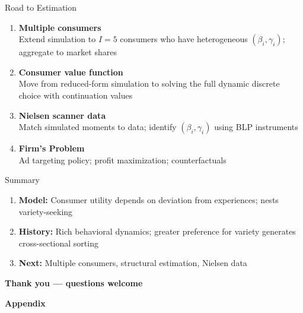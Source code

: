 \documentclass[aspectratio=169,professionalfonts]{beamer}
\newcommand{\hl}[1]{\textbf{\textcolor{UGARed}{#1}}}
\begin{document}
\begin{frame}{Road to Estimation}
  \begin{enumerate}
    \item \hl{Multiple consumers} \\
          Extend simulation to $I = 5$ consumers who have heterogeneous $(\beta_i, \gamma_i)$;
          aggregate to market shares

    \vspace{4pt}
    \item \hl{Consumer value function} \\
          Move from reduced-form simulation to solving the full
          dynamic discrete choice with continuation values

    \vspace{4pt}
    \item \hl{Nielsen scanner data} \\
          Match simulated moments to data;
          identify $(\beta_i, \gamma_i)$ using BLP instruments

    \vspace{4pt}
    \item \hl{Firm's Problem} \\
          Ad targeting policy; profit maximization; counterfactuals
  \end{enumerate}
\end{frame}


\begin{frame}{Summary}
  \begin{enumerate}
    \item \hl{Model:} Consumer utility depends on deviation from
          experiences; nests variety-seeking 

    \vspace{4pt}
    \item \hl{History:} Rich behavioral dynamics; greater preference for variety 
          generates cross-sectional sorting

    \vspace{4pt}
    \item \hl{Next:} Multiple consumers, structural estimation,
          Nielsen data
  \end{enumerate}

  \vspace{10pt}
  \centering
  \Large\textbf{Thank you --- questions welcome}
\end{frame}

\appendix
\begin{frame}
  \centering
  \vspace{2cm}
  {\Large \textbf{Appendix}}
\end{frame}
\end{document}

